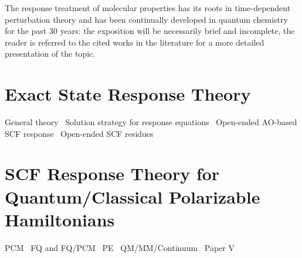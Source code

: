 The response treatment of molecular properties has its roots in
time-dependent perturbation theory\autocite{Konishi2009-zb} and has been
continually developed in quantum chemistry for the past 30 years:
the exposition will be necessarily brief and incomplete, the reader is
referred to the cited works in the literature for a more detailed
presentation of the topic.\autocite{Olsen1985-nr, Helgaker1992-ph, Olsen1995-pf,
Christiansen1998-pe, Norman2011-ad, Helgaker2012-cz, Pawlowski2015-sq}

\section{Exact State Response Theory}\label{sec:exact-response}

General theory~\autocite{Olsen1985-nr, Helgaker1992-ph, Olsen1995-pf,
Christiansen1998-pe, Norman2011-ad, Helgaker2012-cz, Pawlowski2015-sq}
Solution strategy for response equations~\autocite{Saad2003-oa,
Saad2011-gm, Kauczor2011-rd, Malmqvist2013-vw}
Open-ended \acrshort{AO}-based \acrshort{SCF} response~\autocite{
Larsen2000-hj, Kjaergaard2008-hy, Thorvaldsen2008-sg,
Kristensen2008-hv, Ringholm2014-gx}
Open-ended \acrshort{SCF} residues~\autocite{Friese2015-kb}


\section{SCF Response Theory for Quantum/Classical Polarizable Hamiltonians}\label{sec:csm-response}

\acrshort{PCM}~\autocite{Cammi1994-qj, Cammi1996-wf, Cammi1996-vx,
Cammi1999-rb, Cammi2003-qy, Frediani2005-nc, Ferrighi2010-pm}
\acrshort{FQ} and \acrshort{FQ}/\acrshort{PCM}~\autocite{Lipparini2012-hx, Lipparini2012-tl, Lipparini2013-ud}
\acrshort{PE}~\autocite{Olsen2010-wa}
\acrshort{QM}/\acrshort{MM}/Continuum~\autocite{Steindal2011-ki, Caprasecca2012-ir}
Paper V~\autocite{pcm-openrsp}

